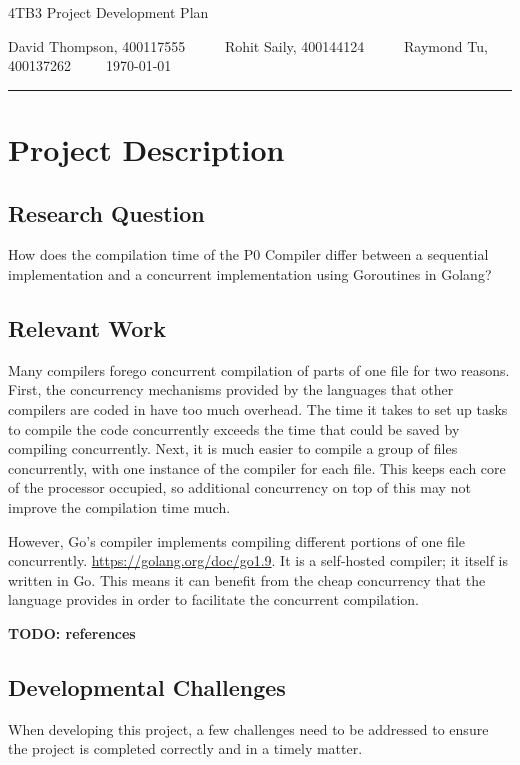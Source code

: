 \documentclass{article}
\author{Rohit Saily, David Thompson, Raymond Tu}
\date{\today}
\title{\mytitle}
\newcommand{\mytitle}{4TB3 Project Development Plan}
\begin{document}
{\sffamily
{\huge \mytitle}

\medskip

David Thompson, 400117555~~~~~
Rohit Saily, 400144124~~~~~
Raymond Tu, 400137262~~~~~\today
}

\par\noindent\rule{\textwidth}{0.4pt}
\bigskip

\section{Project Description}

\subsection{Research Question}

How does the compilation time of the P0 Compiler differ between a sequential implementation and a concurrent implementation using Goroutines in Golang?  

\subsection{Relevant Work}

Many compilers forego concurrent compilation of parts of one file for two
reasons.
First, the concurrency mechanisms provided by the languages that other compilers
are coded in have too much overhead.
The time it takes to set up tasks to compile the code concurrently exceeds the
time that could be saved by compiling concurrently.
Next, it is much easier to compile a group of files concurrently, with one
instance of the compiler for each file.
This keeps each core of the processor occupied, so additional concurrency on top
of this may not improve the compilation time much.

However, Go's compiler implements compiling different portions of one file
concurrently.
\url{https://golang.org/doc/go1.9}.
It is a self-hosted compiler; it itself is written in Go.
This means it can benefit from the cheap concurrency that the language provides
in order to facilitate the concurrent compilation.

\textbf{TODO: references}

\subsection{Developmental Challenges} %
When developing this project, a few challenges need to be addressed to ensure the 
project is completed correctly and in a timely matter.
\end{document}

